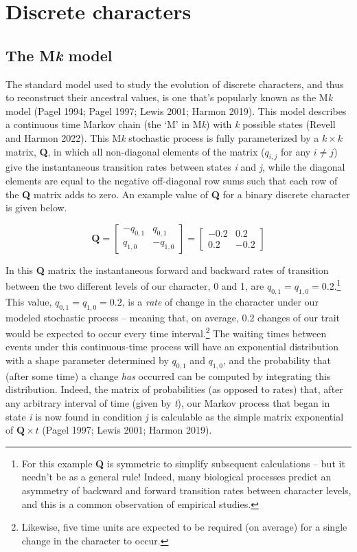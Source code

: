 \documentclass{article}
\begin{document}
\section{Discrete characters}\label{discrete-characters}

\subsection{\texorpdfstring{The M\emph{k} model}{The Mk model}}\label{the-mk-model}

The standard model used to study the evolution of discrete characters, and thus to reconstruct their ancestral values, is one that's popularly known as the M\emph{k} model (Pagel 1994; Pagel 1997; Lewis 2001; Harmon 2019). This model describes a continuous time Markov chain (the `M' in M\emph{k}) with \emph{k} possible states (Revell and Harmon 2022). This M\emph{k} stochastic process is fully parameterized by a \(k \times k\) matrix, \textbf{Q}, in which all non-diagonal elements of the matrix (\(q_{i,j}\) for any \(i \ne j\)) give the instantaneous transition rates between states \emph{i} and \emph{j}, while the diagonal elements are equal to the negative off-diagonal row sums such that each row of the \textbf{Q} matrix adds to zero. An example value of \textbf{Q} for a binary discrete character is given below.

\[\mathbf{Q} = \begin{bmatrix}-q_{0,1} & q_{0,1} \\ q_{1,0} & -q_{1,0}\end{bmatrix} = \begin{bmatrix}-0.2 & 0.2\\ 0.2 & -0.2\end{bmatrix}\]

In this \textbf{Q} matrix the instantaneous forward and backward rates of transition between the two different levels of our character, 0 and 1, are \(q_{0,1} = q_{1,0} = 0.2\).\footnote{For this example \textbf{Q} is symmetric to simplify subsequent calculations -- but it needn't be as a general rule! Indeed, many biological processes predict an asymmetry of backward and forward transition rates between character levels, and this is a common observation of empirical studies.} This value, \(q_{0,1} = q_{1,0} = 0.2\), is a \emph{rate} of change in the character under our modeled stochastic process -- meaning that, on average, 0.2 changes of our trait would be expected to occur every time interval.\footnote{Likewise, five time units are expected to be required (on average) for a single change in the character to occur.} The waiting times between events under this continuous-time process will have an exponential distribution with a shape parameter determined by \(q_{0,1}\) and \(q_{1,0}\), and the probability that (after some time) a change \emph{has} occurred can be computed by integrating this distribution. Indeed, the matrix of probabilities (as opposed to rates) that, after any arbitrary interval of time (given by \emph{t}), our Markov process that began in state \emph{i} is now found in condition \emph{j} is calculable as the simple matrix exponential of \(\mathbf{Q} \times t\) (Pagel 1997; Lewis 2001; Harmon 2019).
\end{document}
